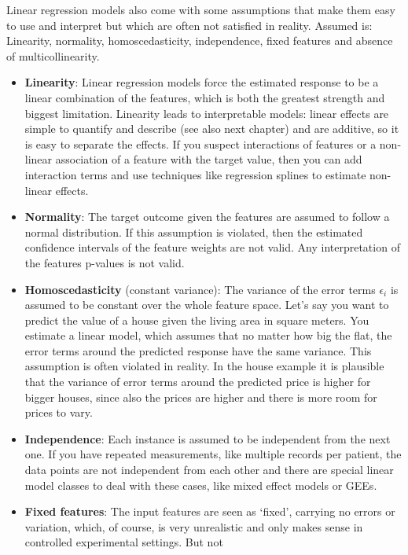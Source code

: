 \documentclass[12pt,]{krantz}
\providecommand{\tightlist}{%
  \setlength{\itemsep}{0pt}\setlength{\parskip}{0pt}}
\theoremstyle{definition}
\theoremstyle{definition}
\theoremstyle{definition}
\theoremstyle{remark}
\begin{document}
Linear regression models also come with some assumptions that make them
easy to use and interpret but which are often not satisfied in reality.
Assumed is: Linearity, normality, homoscedasticity, independence, fixed
features and absence of multicollinearity.

\begin{itemize}
\tightlist
\item
  \textbf{Linearity}: Linear regression models force the estimated
  response to be a linear combination of the features, which is both the
  greatest strength and biggest limitation. Linearity leads to
  interpretable models: linear effects are simple to quantify and
  describe (see also next chapter) and are additive, so it is easy to
  separate the effects. If you suspect interactions of features or a
  non-linear association of a feature with the target value, then you
  can add interaction terms and use techniques like regression splines
  to estimate non-linear effects.
\item
  \textbf{Normality}: The target outcome given the features are assumed
  to follow a normal distribution. If this assumption is violated, then
  the estimated confidence intervals of the feature weights are not
  valid. Any interpretation of the features p-values is not valid.
\item
  \textbf{Homoscedasticity} (constant variance): The variance of the
  error terms \(\epsilon_{i}\) is assumed to be constant over the whole
  feature space. Let's say you want to predict the value of a house
  given the living area in square meters. You estimate a linear model,
  which assumes that no matter how big the flat, the error terms around
  the predicted response have the same variance. This assumption is
  often violated in reality. In the house example it is plausible that
  the variance of error terms around the predicted price is higher for
  bigger houses, since also the prices are higher and there is more room
  for prices to vary.
\item
  \textbf{Independence}: Each instance is assumed to be independent from
  the next one. If you have repeated measurements, like multiple records
  per patient, the data points are not independent from each other and
  there are special linear model classes to deal with these cases, like
  mixed effect models or GEEs.
\item
  \textbf{Fixed features}: The input features are seen as `fixed',
  carrying no errors or variation, which, of course, is very unrealistic
  and only makes sense in controlled experimental settings. But not

\end{itemize}
\end{document}
